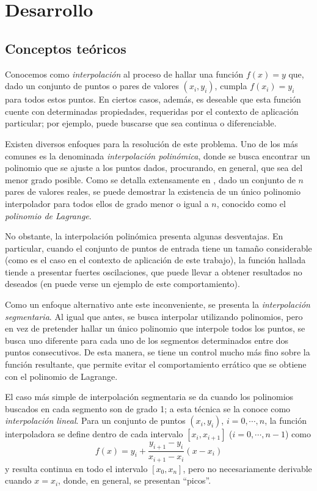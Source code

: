 \section{Desarrollo}
  
  \subsection{Conceptos teóricos}

    Conocemos como \emph{interpolación} al proceso de hallar una función $f(x) = y$ que, dado un conjunto de puntos o pares de valores $(x_i, y_i)$, cumpla $f(x_i) = y_i$ para todos estos puntos. En ciertos casos, además, es deseable que esta función cuente con determinadas propiedades, requeridas por el contexto de aplicación particular; por ejemplo, puede buscarse que sea continua o diferenciable.

    Existen diversos enfoques para la resolución de este problema. Uno de los más comunes es la denominada \emph{interpolación polinómica}, donde se busca encontrar un polinomio que se ajuste a los puntos dados, procurando, en general, que sea del menor grado posible. Como se detalla extensamente en \cite[sec. 3.1]{Burden}, dado un conjunto de $n$ pares de valores reales, se puede demostrar la existencia de un único polinomio interpolador para todos ellos de grado menor o igual a $n$, conocido como el \emph{polinomio de Lagrange}.

    No obstante, la interpolación polinómica presenta algunas desventajas. En particular, cuando el conjunto de puntos de entrada tiene un tamaño considerable (como es el caso en el contexto de aplicación de este trabajo), la función hallada tiende a presentar fuertes oscilaciones, que puede llevar a obtener resultados no deseados (en \cite[p. 158]{Burden} puede verse un ejemplo de este comportamiento).

    Como un enfoque alternativo ante este inconveniente, se presenta la \emph{interpolación segmentaria}. Al igual que antes, se busca interpolar utilizando polinomios, pero en vez de pretender hallar un único polinomio que interpole todos los puntos, se busca uno diferente para cada uno de los segmentos determinados entre dos puntos consecutivos. De esta manera, se tiene un control mucho más fino sobre la función resultante, que permite evitar el comportamiento errático que se obtiene con el polinomio de Lagrange.

    El caso más simple de interpolación segmentaria se da cuando los polinomios buscados en cada segmento son de grado 1; a esta técnica se la conoce como \emph{interpolación lineal}. Para un conjunto de puntos $(x_i, y_i)$, $i = 0, \cdots, n$, la función interpoladora se define dentro de cada intervalo $[x_i, x_{i+1}]$ ($i = 0, \cdots, n-1$) como
      \[ f(x) = y_i + \frac{y_{i+1} - y_i}{x_{i+1} - x_i} (x - x_i) \]
    y resulta continua en todo el intervalo $[x_0, x_n]$, pero no necesariamente derivable cuando $x = x_i$, donde, en general, se presentan ``picos''.


